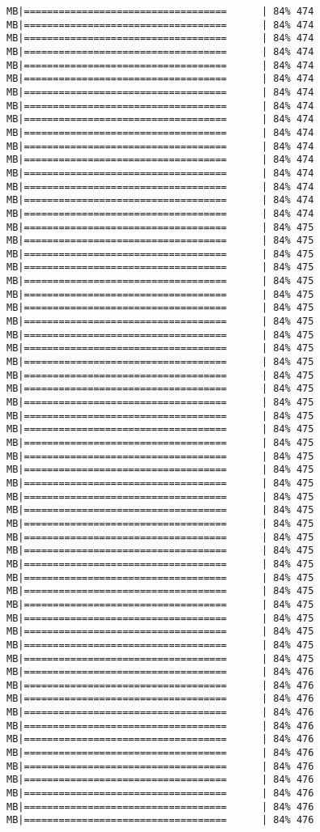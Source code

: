 \documentclass[
]{article}
\begin{document}
\begin{verbatim}
MB|===================================      | 84% 474 MB|===================================      | 84% 474 MB|===================================      | 84% 474 MB|===================================      | 84% 474 MB|===================================      | 84% 474 MB|===================================      | 84% 474 MB|===================================      | 84% 474 MB|===================================      | 84% 474 MB|===================================      | 84% 474 MB|===================================      | 84% 474 MB|===================================      | 84% 474 MB|===================================      | 84% 474 MB|===================================      | 84% 474 MB|===================================      | 84% 474 MB|===================================      | 84% 474 MB|===================================      | 84% 474 MB|===================================      | 84% 475 MB|===================================      | 84% 475 MB|===================================      | 84% 475 MB|===================================      | 84% 475 MB|===================================      | 84% 475 MB|===================================      | 84% 475 MB|===================================      | 84% 475 MB|===================================      | 84% 475 MB|===================================      | 84% 475 MB|===================================      | 84% 475 MB|===================================      | 84% 475 MB|===================================      | 84% 475 MB|===================================      | 84% 475 MB|===================================      | 84% 475 MB|===================================      | 84% 475 MB|===================================      | 84% 475 MB|===================================      | 84% 475 MB|===================================      | 84% 475 MB|===================================      | 84% 475 MB|===================================      | 84% 475 MB|===================================      | 84% 475 MB|===================================      | 84% 475 MB|===================================      | 84% 475 MB|===================================      | 84% 475 MB|===================================      | 84% 475 MB|===================================      | 84% 475 MB|===================================      | 84% 475 MB|===================================      | 84% 475 MB|===================================      | 84% 475 MB|===================================      | 84% 475 MB|===================================      | 84% 475 MB|===================================      | 84% 475 MB|===================================      | 84% 475 MB|===================================      | 84% 476 MB|===================================      | 84% 476 MB|===================================      | 84% 476 MB|===================================      | 84% 476 MB|===================================      | 84% 476 MB|===================================      | 84% 476 MB|===================================      | 84% 476 MB|===================================      | 84% 476 MB|===================================      | 84% 476 MB|===================================      | 84% 476 MB|===================================      | 84% 476 MB|===================================      | 84% 476 
\end{verbatim}
\end{document}
